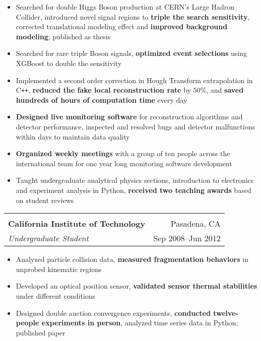 \documentclass[letterpaper,11pt,oneside]{article}
\begin{document}
 \begin{flushleft}
  \begin{small}
 \begin{itemize}[leftmargin=*]
  \item Searched for double Higgs Boson production at CERN's Large Hadron Collider, introduced novel signal regions to \textbf{triple the search sensitivity}, corrected translational modeling effect and \textbf{improved background modeling}; published as thesis
  \item Searched for rare triple Boson signals, \textbf{optimized event selections} using XGBoost to double the sensitivity
  \item Implemented a second order correction in Hough Transform extrapolation in C\texttt{++}, \textbf{reduced the fake local reconstruction rate} by $50\%$, and \textbf{saved hundreds of hours of computation time} every day
   \item\textbf{Designed live monitoring software} for reconstruction algorithms and detector performance, inspected and resolved bugs and detector malfunctions within days to maintain data quality
  \item \textbf{Organized weekly meetings} with a group of ten people across the international team for one year long monitoring software development
  \item Taught undergraduate analytical physics sections, introduction to electronics and experiment analysis in Python, \textbf{received two teaching awards} based on student reviews
 \end{itemize}
  \end{small}
 \end{flushleft}
 \begin{flushleft}
 \vspace{-0.45cm}
 \begin{tabular}{@{} l r@{} }
    \hspace{0.78\linewidth} & \hspace{0.1\linewidth} \\
    \textbf{California Institute of Technology} & Pasadena, CA \\ 
    \textit{Undergraduate Student} & Sep 2008--Jun 2012 \\ 
 \end{tabular}
 \end{flushleft}
 \begin{flushleft}
  \begin{small}
 \begin{itemize}[leftmargin=*]
 \item Analyzed particle collision data, \textbf{measured fragmentation behaviors} in unprobed kinematic regions
 \item Developed an optical position sensor, \textbf{validated sensor thermal stabilities} under different conditions
 \item Designed double auction convergence experiments, \textbf{conducted twelve-people experiments in person}, analyzed time series data in Python; published paper
 \end{itemize}
  \end{small}
 \end{flushleft}
\end{document}
